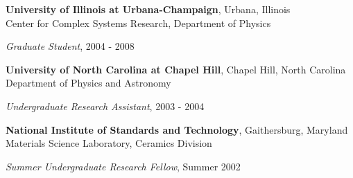 {\bf University of Illinois at Urbana-Champaign}, Urbana, Illinois\\
Center for Complex Systems Research, Department of Physics
\begin{list1}
\item[] {\em Graduate Student}, 2004 - 2008
\end{list1}

{\bf University of North Carolina at Chapel Hill}, Chapel Hill, North Carolina\\
Department of Physics and Astronomy
\begin{list1}
\item[] {\em Undergraduate Research Assistant}, 2003 - 2004
\end{list1}

{\bf National Institute of Standards and Technology}, Gaithersburg, Maryland\\
Materials Science Laboratory, Ceramics Division
\begin{list1}
\item[] {\em Summer Undergraduate Research Fellow}, Summer 2002
\end{list1}

